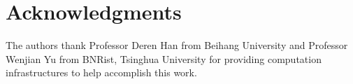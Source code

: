 \section*{Acknowledgments}


The authors thank Professor Deren Han from Beihang University and Professor Wenjian Yu from BNRist, Tsinghua University for providing computation infrastructures to help accomplish this work.

